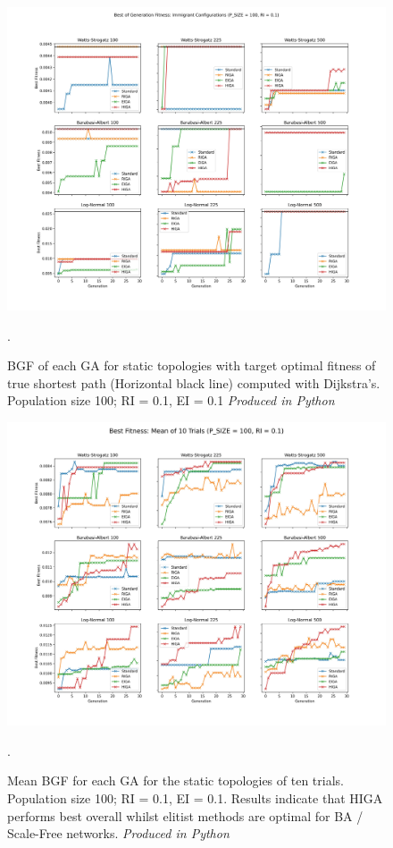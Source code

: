 \documentclass[
	a4paper, %
	10pt, %
	unnumberedsections, %
	twoside, %
]{LTJournalArticle}
\begin{document}
\begin{figure}
	\includegraphics[width=\linewidth]{Figures/sims/static/experiment_3.jpg}
	\caption{BGF of each GA for static topologies with target optimal fitness of true shortest path (Horizontal black line) computed with Dijkstra's. Population size 100; RI = 0.1, EI = 0.1 \emph{Produced in Python}}. 
	\label{fig:static_3}
\end{figure}

\begin{figure}
	\includegraphics[width=\linewidth]{Figures/sims/static/experiment_4.jpg}
	\caption{Mean BGF for each GA for the static topologies of ten trials. Population size 100; RI = 0.1, EI = 0.1. Results indicate that HIGA performs best overall whilst elitist methods are optimal for BA / Scale-Free networks. \emph{Produced in Python}}. 
	\label{fig:static_4}
\end{figure}
\end{document}
